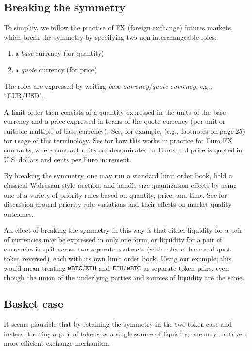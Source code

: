 \documentclass[11pt, reqno]{amsart}
\newcommand{\BTC}{\textnormal{\texttt{wBTC}}}
\newcommand{\ETH}{\textnormal{\texttt{ETH}}}
\begin{document}
\subsection{Breaking the symmetry}
To simplify, we follow the practice of FX (foreign exchange) futures markets,
which break the symmetry by specifying two non-interchangeable roles:
\begin{enumerate}
	\item a \emph{base} currency (for quantity)
	\item a \emph{quote} currency (for price)
\end{enumerate}
The roles are expressed by writing \emph{base currency/quote currency}, e.g.,
``EUR/USD".

A limit order then consists of a quantity expressed in the units of the base
currency and a price expressed in terms of the quote currency (per unit or
suitable multiple of base currency). See, for example, \cite{Cme23} (e.g.,
footnotes on page 25) for usage of this terminology. See \cite{CmeFx} for how
this works in practice for Euro FX contracts, where contract units are
denominated in Euros and price is quoted in U.S. dollars and cents per Euro
increment.

By breaking the symmetry, one may run a standard limit order book, hold a
classical Walrasian-style auction, and handle size quantization effects by
using one of a variety of priority rules based on quantity, price, and time.
See \cite{BeLaLiVa22} for discussion around priority rule variations and their
effects on market quality outcomes.

An effect of breaking the symmetry in this way is that either liquidity for a
pair of currencies may be expressed in only one form, or liquidity for a pair
of currencies is split across two separate contracts (with roles of base and
quote token reversed), each with its own limit order book.
Using our example, this would mean treating $\BTC/\ETH$ and $\ETH/\BTC$ as
separate token pairs, even though the union of the underlying parties and
sources of liquidity are the same.

\subsection{Basket case}
It seems plausible that by retaining the symmetry in the two-token case and
instead treating a pair of tokens as a single source of liquidity, one may
contrive a more efficient exchange mechanism.
\end{document}

